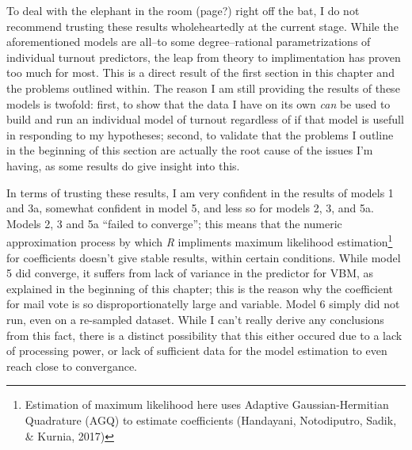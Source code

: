 \documentclass[12pt,twoside]{reedthesis}
\begin{document}
  To deal with the elephant in the room (page?) right off the bat, I do
  not recommend trusting these results wholeheartedly at the current
  stage. While the aforementioned models are all--to some degree--rational
  parametrizations of individual turnout predictors, the leap from theory
  to implimentation has proven too much for most. This is a direct result
  of the first section in this chapter and the problems outlined within.
  The reason I am still providing the results of these models is twofold:
  first, to show that the data I have on its own \emph{can} be used to
  build and run an individual model of turnout regardless of if that model
  is usefull in responding to my hypotheses; second, to validate that the
  problems I outline in the beginning of this section are actually the
  root cause of the issues I'm having, as some results do give insight
  into this.
  
  In terms of trusting these results, I am very confident in the results
  of models 1 and 3a, somewhat confident in model 5, and less so for
  models 2, 3, and 5a. Models 2, 3 and 5a ``failed to converge''; this
  means that the numeric approximation process by which \textit{R}
  impliments maximum likelihood estimation\footnote{Estimation of maximum
    likelihood here uses Adaptive Gaussian-Hermitian Quadrature (AGQ) to
    estimate coefficients (Handayani, Notodiputro, Sadik, \& Kurnia, 2017)}
  for coefficients doesn't give stable results, within certain conditions.
  While model 5 did converge, it suffers from lack of variance in the
  predictor for VBM, as explained in the beginning of this chapter; this
  is the reason why the coefficient for mail vote is so
  disproportionatelly large and variable. Model 6 simply did not run, even
  on a re-sampled dataset. While I can't really derive any conclusions
  from this fact, there is a distinct possibility that this either occured
  due to a lack of processing power, or lack of sufficient data for the
  model estimation to even reach close to convergance.
  
  \clearpage
  
\end{document}
